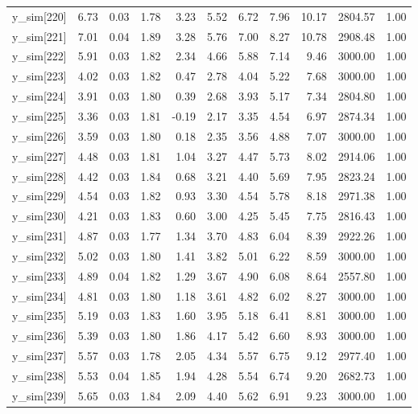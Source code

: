 \begin{table}[ht]
\begin{tabular}{rrrrrrrrrrr}
  y\_sim[220] & 6.73 & 0.03 & 1.78 & 3.23 & 5.52 & 6.72 & 7.96 & 10.17 & 2804.57 & 1.00 \\ 
  y\_sim[221] & 7.01 & 0.04 & 1.89 & 3.28 & 5.76 & 7.00 & 8.27 & 10.78 & 2908.48 & 1.00 \\ 
  y\_sim[222] & 5.91 & 0.03 & 1.82 & 2.34 & 4.66 & 5.88 & 7.14 & 9.46 & 3000.00 & 1.00 \\ 
  y\_sim[223] & 4.02 & 0.03 & 1.82 & 0.47 & 2.78 & 4.04 & 5.22 & 7.68 & 3000.00 & 1.00 \\ 
  y\_sim[224] & 3.91 & 0.03 & 1.80 & 0.39 & 2.68 & 3.93 & 5.17 & 7.34 & 2804.80 & 1.00 \\ 
  y\_sim[225] & 3.36 & 0.03 & 1.81 & -0.19 & 2.17 & 3.35 & 4.54 & 6.97 & 2874.34 & 1.00 \\ 
  y\_sim[226] & 3.59 & 0.03 & 1.80 & 0.18 & 2.35 & 3.56 & 4.88 & 7.07 & 3000.00 & 1.00 \\ 
  y\_sim[227] & 4.48 & 0.03 & 1.81 & 1.04 & 3.27 & 4.47 & 5.73 & 8.02 & 2914.06 & 1.00 \\ 
  y\_sim[228] & 4.42 & 0.03 & 1.84 & 0.68 & 3.21 & 4.40 & 5.69 & 7.95 & 2823.24 & 1.00 \\ 
  y\_sim[229] & 4.54 & 0.03 & 1.82 & 0.93 & 3.30 & 4.54 & 5.78 & 8.18 & 2971.38 & 1.00 \\ 
  y\_sim[230] & 4.21 & 0.03 & 1.83 & 0.60 & 3.00 & 4.25 & 5.45 & 7.75 & 2816.43 & 1.00 \\ 
  y\_sim[231] & 4.87 & 0.03 & 1.77 & 1.34 & 3.70 & 4.83 & 6.04 & 8.39 & 2922.26 & 1.00 \\ 
  y\_sim[232] & 5.02 & 0.03 & 1.80 & 1.41 & 3.82 & 5.01 & 6.22 & 8.59 & 3000.00 & 1.00 \\ 
  y\_sim[233] & 4.89 & 0.04 & 1.82 & 1.29 & 3.67 & 4.90 & 6.08 & 8.64 & 2557.80 & 1.00 \\ 
  y\_sim[234] & 4.81 & 0.03 & 1.80 & 1.18 & 3.61 & 4.82 & 6.02 & 8.27 & 3000.00 & 1.00 \\ 
  y\_sim[235] & 5.19 & 0.03 & 1.83 & 1.60 & 3.95 & 5.18 & 6.41 & 8.81 & 3000.00 & 1.00 \\ 
  y\_sim[236] & 5.39 & 0.03 & 1.80 & 1.86 & 4.17 & 5.42 & 6.60 & 8.93 & 3000.00 & 1.00 \\ 
  y\_sim[237] & 5.57 & 0.03 & 1.78 & 2.05 & 4.34 & 5.57 & 6.75 & 9.12 & 2977.40 & 1.00 \\ 
  y\_sim[238] & 5.53 & 0.04 & 1.85 & 1.94 & 4.28 & 5.54 & 6.74 & 9.20 & 2682.73 & 1.00 \\ 
  y\_sim[239] & 5.65 & 0.03 & 1.84 & 2.09 & 4.40 & 5.62 & 6.91 & 9.23 & 3000.00 & 1.00 \\ 

\end{tabular}
\end{table}
